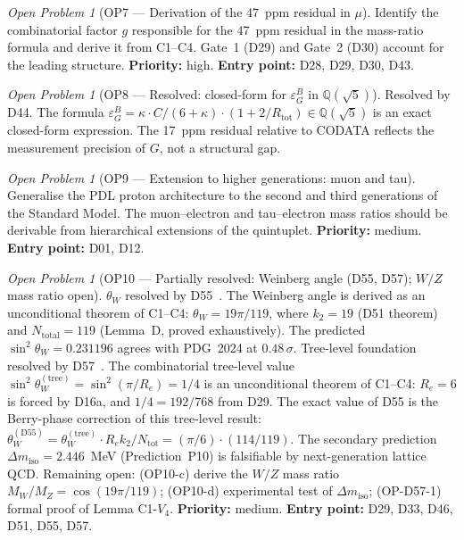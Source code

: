 \documentclass[11pt,a4paper]{article}
\theoremstyle{plain}
\theoremstyle{definition}
\theoremstyle{remark}
\newtheorem{openproblem}[theorem]{Open Problem}
\newcommand{\Rtot}{R_{\mathrm{tot}}}
\newcommand{\epsGeomB}{\varepsilon_G^B}
\begin{document}
\begin{openproblem}[OP7 --- Derivation of the 47~ppm residual in $\mu$]
\label{op:residual}
Identify the combinatorial factor $g$ responsible for the 47~ppm residual in the mass-ratio formula and derive it from C1--C4. Gate~1 (D29) and Gate~2 (D30) account for the leading structure. \textbf{Priority:} high. \textbf{Entry point:} D28, D29, D30, D43.
\end{openproblem}

\begin{openproblem}[OP8 --- Resolved: closed-form for $\epsGeomB$ in $\mathbb{Q}(\sqrt{5})$]
\label{op:epsGeomB}
\textcolor{proofblue}{Resolved by D44.} The formula $\epsGeomB = \kappa \cdot C/(6+\kappa)\cdot(1+2/\Rtot) \in \mathbb{Q}(\sqrt{5})$ is an exact closed-form expression. The 17~ppm residual relative to CODATA reflects the measurement precision of $G$, not a structural gap.
\end{openproblem}

\begin{openproblem}[OP9 --- Extension to higher generations: muon and tau]
\label{op:generations}
Generalise the PDL proton architecture to the second and third generations of the Standard Model. The muon--electron and tau--electron mass ratios should be derivable from hierarchical extensions of the quintuplet. \textbf{Priority:} medium. \textbf{Entry point:} D01, D12.
\end{openproblem}

\begin{openproblem}[OP10 --- Partially resolved: Weinberg angle (D55, D57); $W/Z$ mass ratio open]
\label{op:weak}
\textcolor{proofblue}{$\theta_W$ resolved by D55~\cite{D55}.} The Weinberg angle is derived as an unconditional theorem of C1--C4: $\theta_W = 19\pi/119$, where $k_2 = 19$ (D51 theorem) and $N_{\mathrm{total}} = 119$ (Lemma~D, proved exhaustively). The predicted $\sin^2\theta_W = 0.231196$ agrees with PDG~2024 at $0.48\,\sigma$. \textcolor{proofblue}{Tree-level foundation resolved by D57~\cite{D57}.} The combinatorial tree-level value $\sin^2\theta_W^{(\mathrm{tree})} = \sin^2(\pi/R_e) = 1/4$ is an unconditional theorem of C1--C4: $R_e = 6$ is forced by D16a, and $1/4 = 192/768$ from D29. The exact value of D55 is the Berry-phase correction of this tree-level result: $\theta_W^{(\mathrm{D55})} = \theta_W^{(\mathrm{tree})} \cdot R_e k_2/N_{\mathrm{tot}} = (\pi/6)\cdot(114/119)$. The secondary prediction $\Delta m_{\mathrm{iso}} = 2.446$~MeV (Prediction~P10) is falsifiable by next-generation lattice QCD. Remaining open: (OP10-c) derive the $W/Z$ mass ratio $M_W/M_Z = \cos(19\pi/119)$; (OP10-d) experimental test of $\Delta m_{\mathrm{iso}}$; (OP-D57-1) formal proof of Lemma C1-$V_4$. \textbf{Priority:} medium. \textbf{Entry point:} D29, D33, D46, D51, D55, D57.
\end{openproblem}
\end{document}
